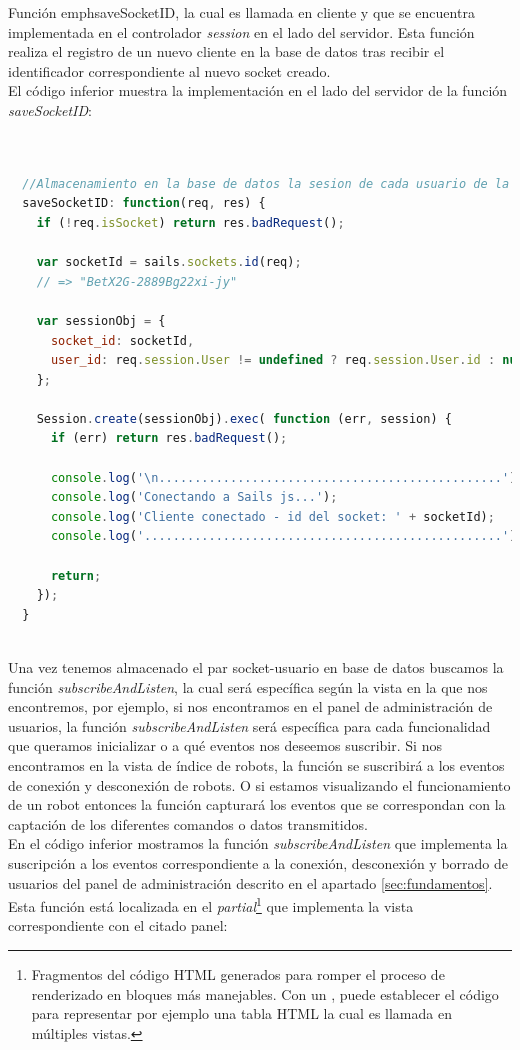 Función emph{saveSocketID}, la cual es llamada en cliente y que se encuentra implementada en el controlador \emph{session} en el lado del servidor. Esta función realiza el registro de un nuevo cliente en
la base de datos tras recibir el identificador correspondiente al nuevo socket creado.\\

El código inferior muestra la implementación en el lado del servidor de la función \emph{saveSocketID}:\\

\begin{lstlisting}[language=JavaScript]


  //Almacenamiento en la base de datos la sesion de cada usuario de la pagina
  saveSocketID: function(req, res) {
    if (!req.isSocket) return res.badRequest();

    var socketId = sails.sockets.id(req);
    // => "BetX2G-2889Bg22xi-jy"

    var sessionObj = {
      socket_id: socketId,
      user_id: req.session.User != undefined ? req.session.User.id : null
    };

    Session.create(sessionObj).exec( function (err, session) {
      if (err) return res.badRequest();

      console.log('\n................................................');
      console.log('Conectando a Sails js...');
      console.log('Cliente conectado - id del socket: ' + socketId);
      console.log('..................................................');

      return;
    });
  }
  
\end{lstlisting}

Una vez tenemos almacenado el par socket-usuario en base de datos buscamos la función \emph{subscribeAndListen}, la cual será específica según la vista en la que nos encontremos, por ejemplo, si nos encontramos en el panel
de administración de usuarios, la función \emph{subscribeAndListen} será específica para cada funcionalidad que queramos inicializar o a qué eventos nos deseemos suscribir. Si nos encontramos en la vista de índice de robots, la función se suscribirá 
a los eventos de conexión y desconexión de robots. O si estamos visualizando el funcionamiento de un robot entonces la función capturará los eventos que se correspondan con la captación de los diferentes comandos o datos transmitidos.\\

En el código inferior mostramos la función \emph{subscribeAndListen} que implementa la suscripción a los eventos correspondiente a la conexión, desconexión y borrado de usuarios del panel de
administración descrito en el apartado \ref{sec:fundamentos}. Esta función está localizada en el \emph{partial}\footnote{ Fragmentos del código HTML generados para romper el proceso de renderizado en bloques más manejables. Con un , puede establecer el código para representar por ejemplo una tabla HTML la cual es llamada en múltiples vistas.} que implementa la vista correspondiente con el citado panel:\\

